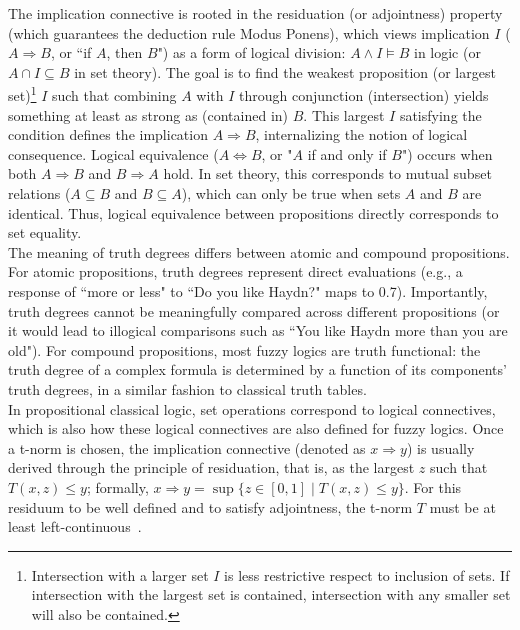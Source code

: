 The implication connective is rooted in the residuation (or adjointness) property (which guarantees the deduction rule Modus Ponens), which views implication $I$ ($A \Rightarrow B$, or ``if $A$, then $B$") as a form of logical division: $A \land I \models B$ in logic (or $A \cap I \subseteq B$ in set theory). The goal is to find the weakest proposition (or largest set)\footnote{Intersection with a larger set $I$ is less restrictive respect to inclusion of sets. If intersection with the largest set is contained, intersection with any smaller set will also be contained.} $I$ such that combining $A$ with $I$ through conjunction (intersection) yields something at least as strong as (contained in) $B$. This largest $I$ satisfying the condition defines the implication $A \Rightarrow B$, internalizing the notion of logical consequence. Logical equivalence ($A \iff B$, or "$A$ if and only if $B$") occurs when both $A \Rightarrow B$ and $B \Rightarrow A$ hold. In set theory, this corresponds to mutual subset relations ($A \subseteq B$ and $B \subseteq A$), which can only be true when sets $A$ and $B$ are identical. Thus, logical equivalence between propositions directly corresponds to set equality.\\

The meaning of truth degrees differs between atomic and compound propositions. For atomic propositions, truth degrees represent direct evaluations (e.g., a response of ``more or less" to ``Do you like Haydn?" maps to 0.7). Importantly, truth degrees cannot be meaningfully compared across different propositions (or it would lead to illogical comparisons such as ``You like Haydn more than you are old"). For compound propositions, most fuzzy logics are truth functional: the truth degree of a complex formula is determined by a function of its components' truth degrees, in a similar fashion to classical truth tables.\\

In propositional classical logic, set operations correspond to logical connectives, which is also how these logical connectives are also defined for fuzzy logics. Once a t-norm is chosen, the implication connective (denoted as $x \Rightarrow y$) is usually derived through the principle of residuation, that is, as the largest $z$ such that $T(x, z) \le y$; formally, $x \Rightarrow y = \sup\{z \in [0,1] \mid T(x, z) \le y\}$. For this residuum to be well defined and to satisfy adjointness, the t-norm $T$ must be at least left-continuous~\cite[p.272]{GodoMonoidal}.\\

